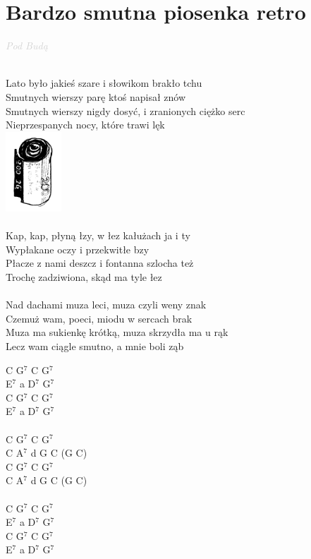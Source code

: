\documentclass[a5paper, 10pt]{book}
\begin{document}
\newpage
\section{Bardzo smutna piosenka retro}\textcolor{lightgray}{\textit{Pod Budą}}\\~\\
\begin{minipage}[t]{0.8\textwidth}
  Lato było jakieś szare i słowikom brakło tchu\\
  Smutnych wierszy parę ktoś napisał znów\\
  Smutnych wierszy nigdy dosyć, i zranionych ciężko serc\\
  Nieprzespanych nocy, które trawi lęk\\
  \includegraphics[height=3cm,right]{images/bardzo_smutna_piosenka.png}\vspace*{-31mm}\\
  \\
  \hspace*{5mm}Kap, kap, płyną łzy, w łez kałużach ja i ty\\
  \hspace*{5mm}Wypłakane oczy i przekwitłe bzy\\
  \hspace*{5mm}Płacze z nami deszcz i fontanna szlocha też\\
  \hspace*{5mm}Trochę zadziwiona, skąd ma tyle łez\\
  \\
  Nad dachami muza leci, muza czyli weny znak\\
  Czemuż wam, poeci, miodu w sercach brak\\
  Muza ma sukienkę krótką, muza skrzydła ma u rąk\\
  Lecz wam ciągle smutno, a mnie boli ząb\\
\end{minipage}
\begin{minipage}[t]{0.2\textwidth}
  C G$^7$ C G$^7$\\
  E$^7$ a D$^7$ G$^7$\\
  C G$^7$ C G$^7$\\
  E$^7$ a D$^7$ G$^7$\\
  \\
  C G$^7$ C G$^7$\\
  C A$^7$ d G C (G C)\\
  C G$^7$ C G$^7$\\
  C A$^7$ d G C (G C)\\
  \\
  C G$^7$ C G$^7$\\
  E$^7$ a D$^7$ G$^7$\\
  C G$^7$ C G$^7$\\
  E$^7$ a D$^7$ G$^7$\\
\end{minipage}
\end{document}
